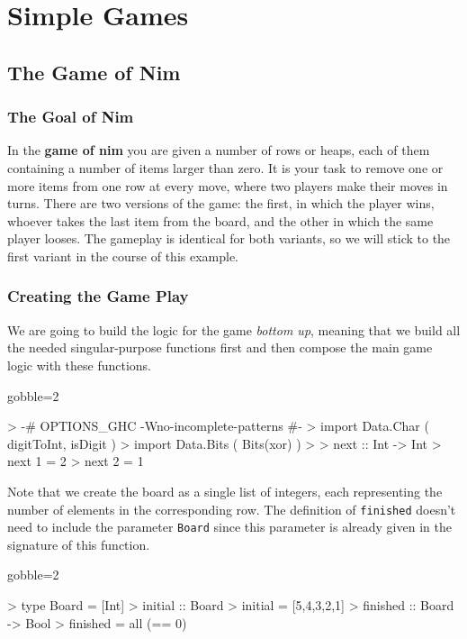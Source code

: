\chapter{Simple Games}

\section{The Game of Nim}

\subsection{The Goal of Nim}

In the \textbf{game of nim} you are given a number of rows or heaps, each of them containing a number of items larger than zero. 
It is your task to remove one or more items from one row at every move, where two players make their moves in turns.
There are two versions of the game: the first, in which the player wins, whoever takes the last item from the board, and the other in which the same player looses.
The gameplay is identical for both variants, so we will stick to the first variant in the course of this example.

\subsection{Creating the Game Play}

We are going to build the logic for the game \emph{bottom up}, meaning that we build all the needed singular-purpose functions first and then compose the main game logic with these functions.

\begin{impl}
\end{impl}
\begin{haskellcode*}{gobble=2}

> {-# OPTIONS_GHC -Wno-incomplete-patterns #-}
> import Data.Char ( digitToInt, isDigit )
> import Data.Bits ( Bits(xor) )
> 
> next :: Int -> Int 
> next 1 = 2
> next 2 = 1

\end{haskellcode*}

\begin{impl}
Note that we create the board as a single list of integers, each representing the number of elements in the corresponding row. The definition of \texttt{finished} doesn't need to include the parameter \texttt{Board} since this parameter is already given in the signature of this function.
\end{impl}
\begin{haskellcode*}{gobble=2}

> type Board = [Int]
> initial :: Board
> initial = [5,4,3,2,1]
> finished :: Board -> Bool
> finished = all (== 0)

\end{haskellcode*}

